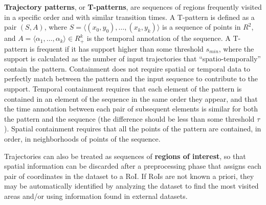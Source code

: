 \textbf{Trajectory patterns}, or \textbf{T-patterns}, are sequences of regions frequently visited in a specific order and with similar transition times. A T-pattern is defined as a pair $(S,A)$, where $S = \langle (x_0, y_0), \dots, (x_k, y_k) \rangle$ is a sequence of points in $R^2$, and $A = \langle \alpha_1, \dots, \alpha_k \rangle \in R^k_+$ is the temporal annotation of the sequence. A T-pattern is frequent if it has support higher than some threshold $s_{min}$, where the support is calculated as the number of input trajectories that ``spatio-temporally'' contain the pattern. Containment does not require spatial or temporal data to perfectly match between the pattern and the input sequence to contribute to the support. Temporal containment requires that each element of the pattern is contained in an element of the sequence in the same order they appear, and that the time annotation between each pair of subsequent elements is similar for both the pattern and the sequence (the difference should be less than some threshold $\tau$). Spatial containment requires that all the points of the pattern are contained, in order, in neighborhoods of points of the sequence.

Trajectories can also be treated as sequences of \textbf{regions of interest}, so that spatial information can be discarded after a preprocessing phase that assigns each pair of coordinates in the dataset to a RoI. If RoIs are not known a priori, they may be automatically identified by analyzing the dataset to find the most visited areas and/or using information found in external datasets.


